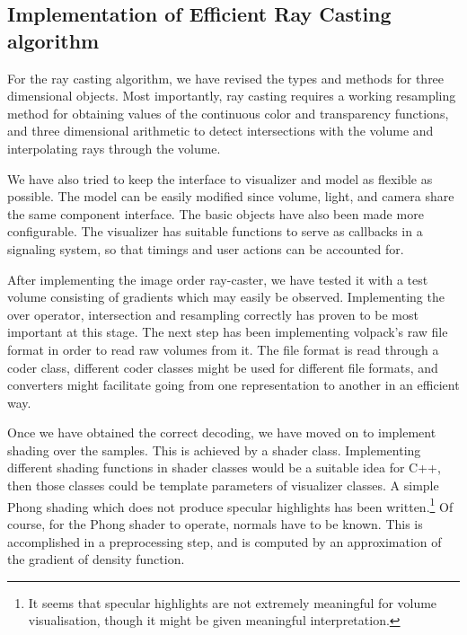 \documentclass[a4paper,12pt]{article}
\begin{document}
\subsection{Implementation of Efficient Ray Casting algorithm}

For the ray casting algorithm, we have revised the types and methods
for three dimensional objects. Most importantly, ray casting requires
a working resampling method for obtaining values of the continuous
color and transparency functions, and three dimensional arithmetic to
detect intersections with the volume and interpolating rays through
the volume.

We have also tried to keep the interface to visualizer and model as
flexible as possible. The model can be easily modified since volume,
light, and camera share the same component interface. The basic
objects have also been made more configurable.
The visualizer has suitable functions to serve
as callbacks in a signaling system, so that timings and user actions
can be accounted for.

After implementing the image order ray-caster, we have tested it with
a test volume consisting of gradients which may easily be
observed. Implementing the over operator, intersection and resampling
correctly has proven to be most important at this stage. The next step
has been implementing volpack's raw file format in order to read
raw volumes from it. The file format is read through a coder class,
different coder classes might be used for different file formats, and
converters might facilitate going from one representation to another
in an efficient way.

Once we have obtained the correct decoding, we
have moved on to implement shading over the samples. This is achieved
by a shader class. Implementing different shading functions in shader
classes would be a suitable idea for C++, then those classes could be
template parameters of visualizer classes. A simple Phong shading which
does not produce specular highlights has been written.\footnote{It
  seems that specular highlights are not extremely meaningful for
  volume visualisation, though it might be given meaningful
  interpretation.} Of course, for
the Phong shader to operate, normals have to be known. This is
accomplished in a preprocessing step, and is computed by an
approximation of the gradient of density function.
\end{document}
